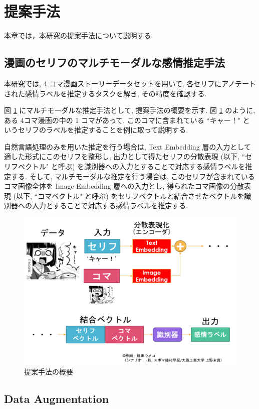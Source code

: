 \newpage
\changeindent{0cm}
\section{提案手法}
\changeindent{2cm}

本章では，本研究の提案手法について説明する.

\changeindent{0cm}
\subsection{漫画のセリフのマルチモーダルな感情推定手法}
\changeindent{2cm}

本研究では, 4 コマ漫画ストーリーデータセットを用いて,
各セリフにアノテートされた感情ラベルを推定するタスクを解き, その精度を確認する.

図 \ref{fig:teian} にマルチモーダルな推定手法として, 提案手法の概要を示す.
図 \ref{fig:teian} のように, ある 4コマ漫画の中の 1 コマがあって, このコマに含まれている ``キャー！" というセリフのラベルを推定することを例に取って説明する.

自然言語処理のみを用いた推定を行う場合は, Text Embedding 層の入力として適した形式にこのセリフを整形し, 出力として得たセリフの分散表現 (以下, ``セリフベクトル" と呼ぶ) を識別器への入力とすることで対応する感情ラベルを推定する. そして, マルチモーダルな推定を行う場合は, このセリフが含まれているコマ画像全体を Image Embedding 層への入力とし, 得られたコマ画像の分散表現 (以下, ``コマベクトル" と呼ぶ) をセリフベクトルと結合させたベクトルを識別器への入力とすることで対応する感情ラベルを推定する.

\begin{figure}[h]
  \centering
  \includegraphics[width=0.7\hsize]{doc/figures/teian_2.png}
  \caption{提案手法の概要}
  \label{fig:teian}
\end{figure}

\newpage
\changeindent{0cm}
\subsection{Data Augmentation}
\changeindent{2cm}

